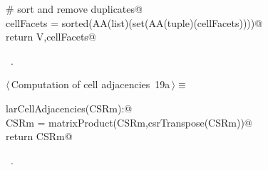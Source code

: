 \documentclass[11pt,oneside]{article}	%
\begin{document}
\begin{flushleft}
\begin{list}{}{}
\mbox{}\verb@   # sort and remove duplicates@\\
\mbox{}\verb@   cellFacets = sorted(AA(list)(set(AA(tuple)(cellFacets))))@\\
\mbox{}\verb@   return V,cellFacets@\\
\mbox{}\verb@@{\NWsep}
\end{list}
\vspace{-1ex}
\footnotesize\addtolength{\baselineskip}{-1ex}
\begin{list}{}{\setlength{\itemsep}{-\parsep}\setlength{\itemindent}{-\leftmargin}}
\item \NWtxtMacroRefIn\ .
\end{list}
\end{flushleft}



\begin{flushleft} \small \label{scrap29}
\protect{}$\langle\,$Computation of cell adjacencies\nobreak\ {\footnotesize 19a}$\,\rangle\equiv$
\vspace{-1ex}
\begin{list}{}{} \item
\mbox{}\verb@def larCellAdjacencies(CSRm):@\\
\mbox{}\verb@   CSRm = matrixProduct(CSRm,csrTranspose(CSRm))@\\
\mbox{}\verb@   return CSRm@\\
\mbox{}\verb@@{\NWsep}
\end{list}
\vspace{-1ex}
\footnotesize\addtolength{\baselineskip}{-1ex}
\begin{list}{}{\setlength{\itemsep}{-\parsep}\setlength{\itemindent}{-\leftmargin}}
\item \NWtxtMacroRefIn\ .
\end{list}
\end{flushleft}
\end{document}
